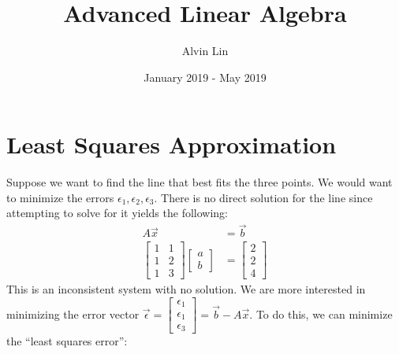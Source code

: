 \documentclass{math}
\title{Advanced Linear Algebra}
\author{Alvin Lin}
\date{January 2019 - May 2019}
\begin{document}
\maketitle

\section*{Least Squares Approximation}
\begin{center}
\end{center}
Suppose we want to find the line that best fits the three points. We would want
to minimize the errors \( \epsilon_1,\epsilon_2,\epsilon_3 \). There is no
direct solution for the line since attempting to solve for it yields the
following:
\begin{align*}
  A\vec{x} &= \vec{b} \\
  \begin{bmatrix}
    1 & 1 \\
    1 & 2 \\
    1 & 3
  \end{bmatrix}\begin{bmatrix}a \\ b\end{bmatrix} &= \begin{bmatrix}
    2 \\ 2 \\ 4
  \end{bmatrix}
\end{align*}
This is an inconsistent system with no solution. We are more interested in
minimizing the error vector \( \vec{\epsilon} = \begin{bmatrix}\epsilon_1 \\
\epsilon_1 \\ \epsilon_3 \end{bmatrix} = \vec{b}-A\vec{x} \). To do this, we
can minimize the ``least squares error'':
\end{document}
